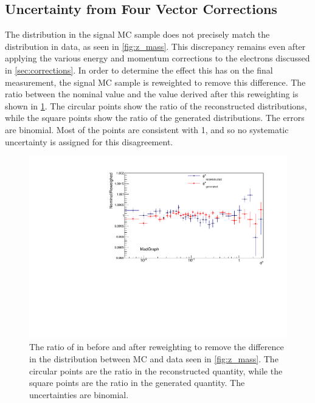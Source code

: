 \subsection{Uncertainty from Four Vector Corrections}
\label{four_vector_uncertainty}

The \mee distribution in the \MADGRAPH signal MC sample does not precisely
match the distribution in data, as seen in \cref{fig:z_mass}. This
discrepancy remains even after applying the various energy and momentum
corrections to the electrons discussed in \cref{sec:corrections}. In order
to determine the effect this has on the final measurement, the \MADGRAPH signal
MC sample is reweighted to remove this difference. The ratio between the
nominal \phistar value and the value derived after this reweighting is shown in
\cref{fig:z_mass_reweighted}. The circular points show the ratio of the
reconstructed \phistar distributions, while the square points show the ratio of
the generated \phistar distributions. The errors are binomial. Most of the
points are consistent with \num{1}, and so no systematic uncertainty is
assigned for this disagreement.

\begin{figure}[!htbp]
    \centering
    \includegraphics[width=\textwidth]{figures/ZMass_reweighed.pdf}
    \caption[
        The ratio of \phistar in \MADGRAPH before and after reweighting to
        remove the differnce in the \mee distribution between MC and data.
    ]{
        The ratio of \phistar in \MADGRAPH before and after reweighting to
        remove the difference in the \mee distribution between MC and data seen
        in \cref{fig:z_mass}. The circular points are the ratio in the
        reconstructed quantity, while the square points are the ratio in the
        generated quantity. The uncertainties are binomial.
    }
    \label{fig:z_mass_reweighted}
\end{figure}

